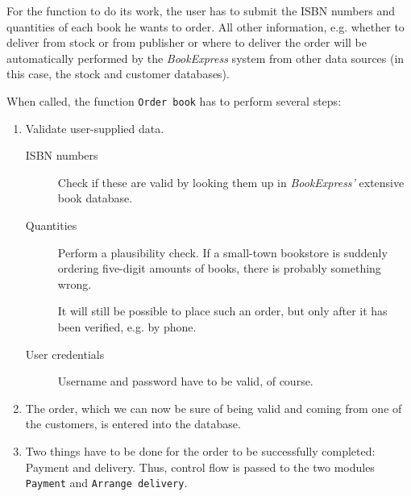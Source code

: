 For the function to do its work, the user has to submit the ISBN numbers and quantities of each book he wants to order.
All other information, e.g. whether to deliver from stock or from publisher or where to deliver the order will be automatically
performed by the \emph{BookExpress} system from other data sources (in this case, the stock and customer databases).

When called, the function \texttt{Order book} has to perform several steps:
\begin{enumerate}
	\item Validate user-supplied data.

		  \begin{description}
		  	\item[ISBN numbers] Check if these are valid by looking them up in \emph{BookExpress'} extensive book database.
			\item[Quantities]   Perform a plausibility check. If a small-town bookstore is suddenly ordering five-digit amounts of books,
			                    there is probably something wrong.

								It will still be possible to place such an order, but only after it has been verified, e.g. by phone.
			\item[User credentials] Username and password have to be valid, of course.
		  \end{description}
   \item The order, which we can now be sure of being valid and coming from one of the customers, is entered into the database.
   \item Two things have to be done for the order to be successfully completed: Payment and delivery. Thus, control flow is passed to the
         two modules \texttt{Payment} and \texttt{Arrange delivery}.
\end{enumerate}

